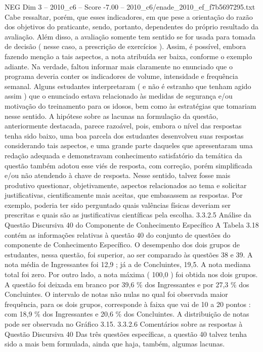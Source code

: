 \begin{textsample}{NEG Dim 3 – 2010\_c6 – Score -7.00 – 2010\_c6/enade\_2010\_ef\_f7b5697295.txt}
Cabe ressaltar, porém, que esses indicadores, em que pese a orientação do razão dos objetivos do praticante, sendo, portanto, dependentes do próprio resultado da avaliação.
Além disso, a avaliação somente tem sentido se for usada para tomada de decisão ( nesse caso, a prescrição de exercícios ).
Assim, é possível, embora fazendo menção a tais aspectos, a nota atribuída ser baixa, conforme o exemplo adiante.
Na verdade, faltou informar mais claramente no enunciado que o programa deveria conter os indicadores de volume, intensidade e frequência semanal.
Alguns estudantes interpretaram ( e não é estranho que tenham agido assim ) que o enunciado estava relacionado às medidas de segurança e/ou motivação do treinamento para os idosos, bem como às estratégias que tomariam nesse sentido.
A hipótese sobre as lacunas na formulação da questão, anteriormente destacada, parece razoável, pois, embora o nível das respostas tenha sido baixo, uma boa parcela dos estudantes desenvolveu suas respostas considerando tais aspectos, e uma grande parte daqueles que apresentaram uma redação adequada e demonstravam conhecimento satisfatório da temática da questão também adotou esse viés de resposta, com correção, porém simplificada e/ou não atendendo à chave de resposta.
Nesse sentido, talvez fosse mais produtivo questionar, objetivamente, aspectos relacionados ao tema e solicitar justificativas, cientificamente mais aceitas, que embasassem as respostas.
Por exemplo, poderia ter sido perguntado quais valências físicas deveriam ser prescritas e quais são as justificativas científicas pela escolha. 3.3.2.5 Análise da Questão Discursiva 40 do Componente de Conhecimento Específico A Tabela 3.18 contém as informações relativas à questão 40 do conjunto de questões do componente de Conhecimento Específico.
O desempenho dos dois grupos de estudantes, nessa questão, foi superior, ao ser comparado às questões 38 e 39.
A nota média de Ingressantes foi 12,9 ; já a de Concluintes, 19,5.
A nota mediana total foi zero.
Por outro lado, a nota máxima ( 100,0 ) foi obtida nos dois grupos.
A questão foi deixada em branco por 39,6 \% dos Ingressantes e por 27,3 \% dos Concluintes.
O intervalo de notas não nulas no qual foi observada maior frequência, para os dois grupos, corresponde à faixa que vai de 10 a 20 pontos : com 18,9 \% dos Ingressantes e 20,6 \% dos Concluintes.
A distribuição de notas pode ser observada no Gráfico 3.15. 3.3.2.6 Comentários sobre as respostas à Questão Discursiva 40 Das três questões específicas, a questão 40 talvez tenha sido a mais bem formulada, ainda que haja, também, algumas lacunas.

\end{textsample}
